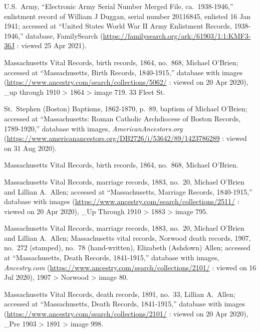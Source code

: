 \begin{thebibliography}{999}
U.S.\ Army, ``Electronic Army Serial Number Merged File, ca.\ 1938-1946,'' enlistment record of William J Duggan, serial number 20116845, enlisted 16 Jan 1941; accessed at ``United States World War II Army Enlistment Records, 1938-1946,'' database, FamilySearch (\url{https://familysearch.org/ark:/61903/1:1:KMF3-36J} : viewed 25 Apr 2021).


Massachusetts Vital Records, birth records, 1864, no.\ 868, Michael O'Brien; accessed at ``Massachusetts, Birth Records, 1840-1915,'' database with images (\url{https://www.ancestry.com/search/collections/5062/} : viewed on 20 Apr 2020), \_up through 1910 > 1864 > image 719. 33 Fleet St.

St.\ Stephen (Boston) Baptisms, 1862-1870, p.\ 89, baptism of Michael O'Brien; accessed at ``Massachusetts: Roman Catholic Archdiocese of Boston Records, 1789-1920,'' database with images, \textit{AmericanAncestors.org} (\url{https://www.americanancestors.org/DB2726/i/53642/89/1423786289} : viewed on 31 Aug 2020).

Massachusetts Vital Records, birth records, 1864, no.\ 868, Michael O'Brien.

Massachusetts Vital Records, marriage records, 1883, no.\ 20, Michael O'Brien and Lillian A.\ Allen; accessed at ``Massachusetts, Marriage Records, 1840-1915,'' database with images (\url{https://www.ancestry.com/search/collections/2511/} : viewed on 20 Apr 2020), \_Up Through 1910 > 1883 > image 795.

Massachusetts Vital Records, marriage records, 1883, no.\ 20, Michael O'Brien and Lillian A.\ Allen; Massachusetts vital records, Norwood death records, 1907, no.\ 272 (stamped), no.\ 78 (hand-written), Elizabeth (Ashdown) Allen; accessed at ``Massachusetts, Death Records, 1841-1915,'' database with images, \textit{Ancestry.com} (\url{https://www.ancestry.com/search/collections/2101/} : viewed on 16 Jul 2020), 1907 > Norwood > image 80.

Massachusetts Vital Records, death records, 1891, no.\ 33, Lillian A.\ Allen; accessed at ``Massachusetts, Death Records, 1841-1915,'' database with images (\url{https://www.ancestry.com/search/collections/2101/} : viewed on 20 Apr 2020), \_Pre 1903 > 1891 > image 998.


\end{thebibliography}
